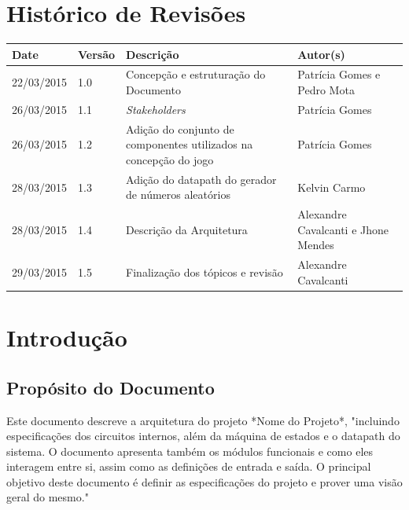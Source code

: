 \documentclass{report}
\begin{document}

\capa
\newpage
\newpage

\chapter*{Histórico de Revisões}
  \vspace*{1cm}
  \begin{table}[ht]
    \centering
    \begin{tabular}[pos]{|m{2cm} |m{2cm}| m{6cm} | m{3cm}|} 
      \hline
      \cellcolor[gray]{0.9}
      \textbf{Date} & \cellcolor[gray]{0.9} \textbf{Versão}  &\cellcolor[gray]{0.9}\textbf{Descrição} & \cellcolor[gray]{0.9}\textbf{Autor(s)}\\
      \hline
      22/03/2015 & 1.0 & Concepção e estruturação do Documento & Patrícia Gomes e Pedro Mota \\ \hline      
      26/03/2015 & 1.1 & \textit{Stakeholders} & Patrícia Gomes \\ \hline
      26/03/2015 & 1.2 & Adição do conjunto de componentes utilizados na concepção do jogo & Patrícia Gomes \\ \hline
	  28/03/2015 & 1.3 & Adição do datapath do gerador de números aleatórios & Kelvin Carmo \\ \hline      
      28/03/2015 & 1.4 & Descrição da Arquitetura & Alexandre Cavalcanti e Jhone Mendes \\ \hline
      29/03/2015 & 1.5 & Finalização dos tópicos e revisão & Alexandre Cavalcanti \\ \hline
    \end{tabular}
  \end{table}

\tableofcontents

\chapter{Introdução}
  
  \section{Propósito do Documento}
  Este documento descreve a arquitetura do projeto *Nome do Projeto*, "incluindo especificações dos circuitos internos, além da máquina de estados e o datapath do sistema. O documento apresenta também os módulos funcionais e como eles interagem entre si, assim como as definições de entrada e saída. O principal objetivo deste documento é definir as especificações do projeto e prover uma visão geral do mesmo."
\end{document}
